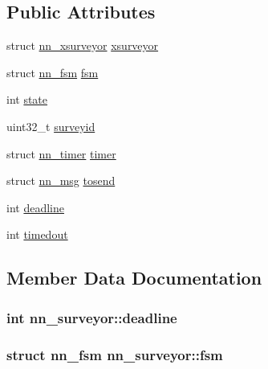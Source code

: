 \subsection*{Public Attributes}
\begin{DoxyCompactItemize}
\item 
struct \hyperlink{structnn__xsurveyor}{nn\+\_\+xsurveyor} \hyperlink{structnn__surveyor_ab1b13ce4b6625436d5702e25c80d01ee}{xsurveyor}
\item 
struct \hyperlink{structnn__fsm}{nn\+\_\+fsm} \hyperlink{structnn__surveyor_ae3c087d0522c6dd6d15a380c7cada355}{fsm}
\item 
int \hyperlink{structnn__surveyor_affc3200017272d3e32f61e5f580845fd}{state}
\item 
uint32\+\_\+t \hyperlink{structnn__surveyor_a99902f4cd47871c07da694e751ae98aa}{surveyid}
\item 
struct \hyperlink{structnn__timer}{nn\+\_\+timer} \hyperlink{structnn__surveyor_a2a83430636c385e2bc375a0a650d7ba3}{timer}
\item 
struct \hyperlink{structnn__msg}{nn\+\_\+msg} \hyperlink{structnn__surveyor_ac8ab54591fb9abfa2f854b1357a74edf}{tosend}
\item 
int \hyperlink{structnn__surveyor_a57cec3e3c6270ddc7ef7eb82134fc809}{deadline}
\item 
int \hyperlink{structnn__surveyor_a6f966b4fd12270e2a8905a2a71289041}{timedout}
\end{DoxyCompactItemize}


\subsection{Member Data Documentation}
\subsubsection[{deadline}]{\setlength{\rightskip}{0pt plus 5cm}int nn\+\_\+surveyor\+::deadline}\hypertarget{structnn__surveyor_a57cec3e3c6270ddc7ef7eb82134fc809}{}\label{structnn__surveyor_a57cec3e3c6270ddc7ef7eb82134fc809}
\subsubsection[{fsm}]{\setlength{\rightskip}{0pt plus 5cm}struct {\bf nn\+\_\+fsm} nn\+\_\+surveyor\+::fsm}\hypertarget{structnn__surveyor_ae3c087d0522c6dd6d15a380c7cada355}{}\label{structnn__surveyor_ae3c087d0522c6dd6d15a380c7cada355}
